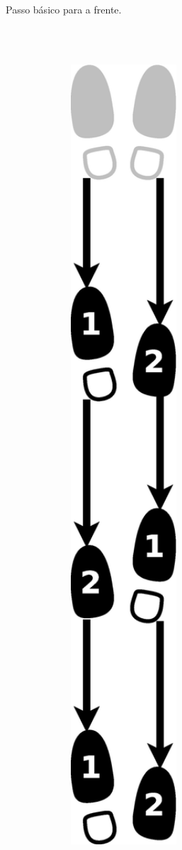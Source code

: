 \begin{figure}[h]
\begin{subfigure}[b]{0.65\textwidth}
        \caption{Passo básico para a frente.}
        \label{fig:samba-cancao-basico-frente}
    \end{subfigure}
    ~\\~\\ %
    
    \begin{subfigure}[b]{0.65\textwidth}
        \centering
	\includegraphics[angle=270,width=0.97\textwidth]{chapters/cap-historia-sambagafieira/samba-cancao-basico-tras.eps}

\end{subfigure}
\end{figure}
